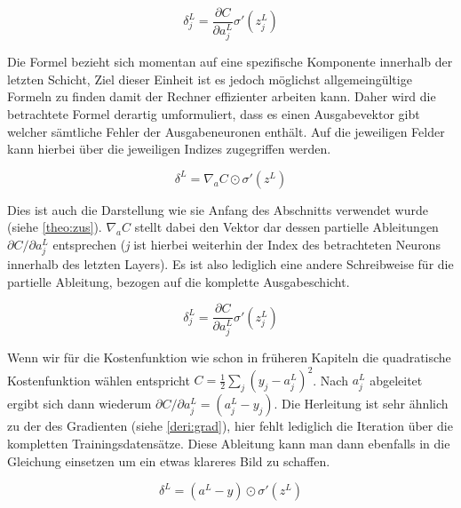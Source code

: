 \begin{equation}
\delta^L_j = \frac{\partial C}{\partial a^L_j} \sigma'(z^L_j)
\end{equation}

Die Formel bezieht sich momentan auf eine spezifische Komponente innerhalb der letzten Schicht, Ziel dieser Einheit ist es jedoch möglichst allgemeingültige Formeln zu finden damit der Rechner effizienter arbeiten kann. Daher wird die betrachtete Formel derartig umformuliert, dass es einen Ausgabevektor gibt welcher sämtliche Fehler der Ausgabeneuronen enthält. Auf die jeweiligen Felder kann hierbei über die jeweiligen Indizes zugegriffen werden. 

\begin{equation}
\delta^L = \nabla_a C \odot \sigma'(z^L)
\end{equation}

Dies ist auch die Darstellung wie sie Anfang des Abschnitts verwendet wurde (siehe \ref{theo:zus}). $\nabla_a C$ stellt dabei den Vektor dar dessen partielle Ableitungen $\partial C / \partial a^L_j$ entsprechen (\emph{j} ist hierbei weiterhin der Index des betrachteten Neurons innerhalb des letzten Layers). Es ist also lediglich eine andere Schreibweise für die partielle Ableitung, bezogen auf die komplette Ausgabeschicht. 

\begin{equation}
\delta^L_j = \frac{\partial C}{\partial a^L_j} \sigma'(z^L_j)
\end{equation}


Wenn wir für die Kostenfunktion wie schon in früheren Kapiteln die quadratische Kostenfunktion wählen entspricht $C = \frac{1}{2} \sum_j (y_j-a^L_j)^2$. Nach $a^L_j$ abgeleitet ergibt sich dann wiederum $\partial C / \partial a^L_j = (a_j^L-y_j)$. Die Herleitung ist sehr ähnlich zu der des Gradienten (siehe \ref{deri:grad}), hier fehlt lediglich die Iteration über die kompletten Trainingsdatensätze. Diese Ableitung kann man dann ebenfalls in die Gleichung einsetzen um ein etwas klareres Bild zu schaffen. 

\begin{equation}
\delta^L = (a^L-y) \odot \sigma'(z^L)
\end{equation}
 
